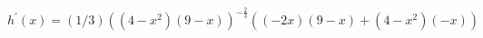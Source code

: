 $ \displaystyle h^{\prime}(x) = (1/3)((4 - x^2)(9 - x))^{-\frac{2}{3}} \left((-2x)(9 - x) + (4 - x^2)(- x)\right)$